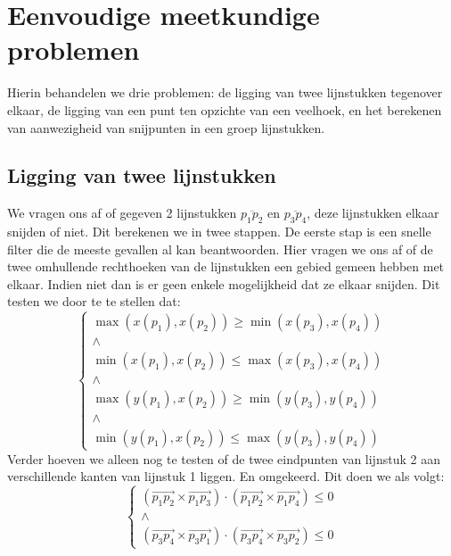 \documentclass[a4paper,titlepage]{article}
\newcommand{\lineparr}[1]{\overrightarrow{#1}}
\newcommand{\linep}[1]{\overline{#1}}
\newcommand{\brak}[1]{\left(#1\right)}
\begin{document}
\section{Eenvoudige meetkundige problemen}
Hierin behandelen we drie problemen: de ligging van twee lijnstukken tegenover elkaar, de ligging van een punt ten opzichte van een veelhoek, en het berekenen van aanwezigheid van snijpunten in een groep lijnstukken.
\subsection{Ligging van twee lijnstukken}
We vragen ons af of gegeven 2 lijnstukken $\linep{p_1p_2}$ en $\linep{p_3p_4}$, deze lijnstukken elkaar snijden of niet. Dit berekenen we in twee stappen. De eerste stap is een snelle filter die de meeste gevallen al kan beantwoorden. Hier vragen we ons af of de twee omhullende rechthoeken van de lijnstukken een gebied gemeen hebben met elkaar. Indien niet dan is er geen enkele mogelijkheid dat ze elkaar snijden. Dit testen we door te te stellen dat:
\begin{equation}
\left\{
\begin{array}{c}
\max\brak{x\brak{p_1},x\brak{p_2}}\geq\min\brak{x\brak{p_3},x\brak{p_4}}\\
\wedge\\
\min\brak{x\brak{p_1},x\brak{p_2}}\leq\max\brak{x\brak{p_3},x\brak{p_4}}\\
\wedge\\
\max\brak{y\brak{p_1},x\brak{p_2}}\geq\min\brak{y\brak{p_3},y\brak{p_4}}\\
\wedge\\
\min\brak{y\brak{p_1},x\brak{p_2}}\leq\max\brak{y\brak{p_3},y\brak{p_4}}
\end{array}
\right.
\end{equation}
Verder hoeven we alleen nog te testen of de twee eindpunten van lijnstuk 2 aan verschillende kanten van lijnstuk 1 liggen. En omgekeerd. Dit doen we als volgt:
\begin{equation}
\left\{
\begin{array}{c}
\brak{\lineparr{p_1p_2}\times\lineparr{p_1p_3}}\cdot\brak{\lineparr{p_1p_2}\times\lineparr{p_1p_4}}\leq0\\
\wedge\\
\brak{\lineparr{p_3p_4}\times\lineparr{p_3p_1}}\cdot\brak{\lineparr{p_3p_4}\times\lineparr{p_3p_2}}\leq0
\end{array}
\right.
\end{equation}
\end{document}
